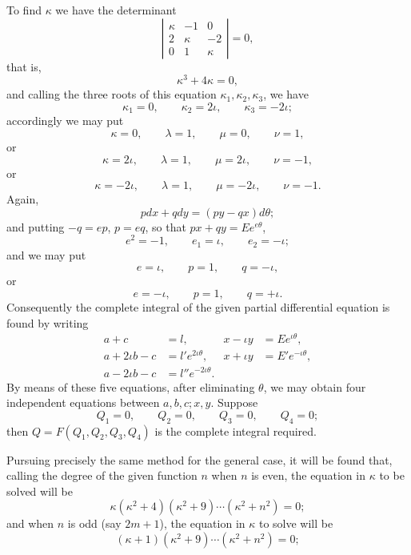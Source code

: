 \documentclass[11pt]{article}
\newcommand{\sourcepage}[1]{\marginpar{\scriptsize p.~#1}}
\begin{document}
\sourcepage{359}
To find $\kappa$ we have the determinant
\[
\left|\begin{array}{ccc}
\kappa&-1&0\\
2&\kappa&-2\\
0&1&\kappa
\end{array}\right|=0,
\]
that is,
\[
\kappa^3+4\kappa=0,
\]
and calling the three roots of this equation $\kappa_1,\kappa_2,\kappa_3$, we have
\[
\kappa_1=0,
\qquad \kappa_2=2\iota,
\qquad \kappa_3=-2\iota;
\]
accordingly we may put
\[
\kappa=0,
\qquad \lambda=1,
\qquad \mu=0,
\qquad \nu=1,
\]
or
\[
\kappa=2\iota,
\qquad \lambda=1,
\qquad \mu=2\iota,
\qquad \nu=-1,
\]
or
\[
\kappa=-2\iota,
\qquad \lambda=1,
\qquad \mu=-2\iota,
\qquad \nu=-1.
\]
Again,
\[
pdx+qdy=(py-qx)d\theta;
\]
and putting $-q=ep$, $p=eq$, so that $px+qy=Ee^{e\theta}$,
\[
e^2=-1,
\qquad e_1=\iota,
\qquad e_2=-\iota;
\]
and we may put
\[
e=\iota,
\qquad p=1,
\qquad q=-\iota,
\]
or
\[
e=-\iota,
\qquad p=1,
\qquad q=+\iota.
\]
Consequently the complete integral of the given partial differential equation is found by writing
\[
\begin{array}{rlrl}
a+c&=l,& x-\iota y&=Ee^{\iota\theta},\\
a+2\iota b-c&=l'e^{2\iota\theta},& x+\iota y&=E'e^{-\iota\theta},\\
a-2\iota b-c&=l''e^{-2\iota\theta}.&
\end{array}
\]
By means of these five equations, after eliminating $\theta$, we may obtain four independent equations between $a,b,c;x,y$. Suppose
\[
Q_1=0,
\qquad Q_2=0,
\qquad Q_3=0,
\qquad Q_4=0;
\]
then $Q=F(Q_1,Q_2,Q_3,Q_4)$ is the complete integral required.

Pursuing precisely the same method for the general case, it will be found that, calling the degree of the given function $n$ when $n$ is even, the equation in $\kappa$ to be solved will be
\[
\kappa(\kappa^2+4)(\kappa^2+9)\cdots(\kappa^2+n^2)=0;
\]
and when $n$ is odd (say $2m+1$), the equation in $\kappa$ to solve will be
\[
(\kappa+1)(\kappa^2+9)\cdots(\kappa^2+n^2)=0;
\]
\end{document}
